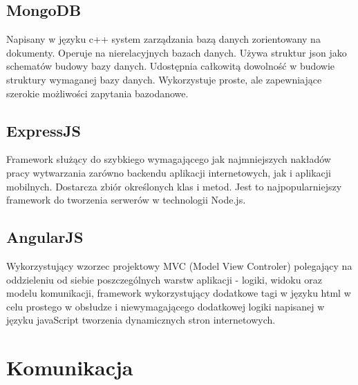 \documentclass[12pt]{report}
\begin{document}
\subsection{MongoDB}
Napisany w języku c++ system zarządzania bazą danych zorientowany na dokumenty. 
Operuje na nierelacyjnych bazach danych. 
Używa struktur json jako schematów budowy bazy danych.
Udostępnia całkowitą dowolność w budowie struktury wymaganej bazy danych. 
Wykorzystuje proste, ale zapewniające szerokie możliwości zapytania bazodanowe.

\subsection{ExpressJS }
Framework służący do szybkiego wymagającego jak najmniejszych nakładów pracy wytwarzania zarówno backendu aplikacji internetowych, jak i aplikacji mobilnych.
Dostarcza zbiór określonych klas i metod. Jest to najpopularniejszy framework do tworzenia serwerów w technologii Node.js.

\subsection{AngularJS}
Wykorzystujący wzorzec projektowy MVC (Model View Controler) polegający na oddzieleniu od siebie poszczególnych warstw aplikacji - logiki, widoku oraz modelu komunikacji, framework wykorzystujący dodatkowe tagi w języku html w celu prostego w obsłudze i niewymagającego dodatkowej logiki napisanej w języku javaScript tworzenia dynamicznych stron internetowych.

\section{Komunikacja}
\end{document}
